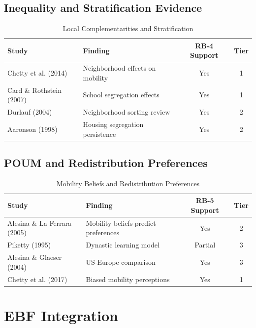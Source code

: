 \subsection{Inequality and Stratification Evidence}

\begin{table}[htbp]
\centering
\caption{Local Complementarities and Stratification}
\label{tab:rb-stratification}
\begin{tabular}{llcc}
\toprule
\textbf{Study} & \textbf{Finding} & \textbf{RB-4 Support} & \textbf{Tier} \\
\midrule
Chetty et al. (2014) & Neighborhood effects on mobility & Yes & 1 \\
Card \& Rothstein (2007) & School segregation effects & Yes & 1 \\
Durlauf (2004) & Neighborhood sorting review & Yes & 2 \\
Aaronson (1998) & Housing segregation persistence & Yes & 2 \\
\bottomrule
\end{tabular}
\end{table}

\subsection{POUM and Redistribution Preferences}

\begin{table}[htbp]
\centering
\caption{Mobility Beliefs and Redistribution Preferences}
\label{tab:rb-poum}
\begin{tabular}{llcc}
\toprule
\textbf{Study} & \textbf{Finding} & \textbf{RB-5 Support} & \textbf{Tier} \\
\midrule
Alesina \& La Ferrara (2005) & Mobility beliefs predict preferences & Yes & 2 \\
Piketty (1995) & Dynastic learning model & Partial & 3 \\
Alesina \& Glaeser (2004) & US-Europe comparison & Yes & 3 \\
Chetty et al. (2017) & Biased mobility perceptions & Yes & 1 \\
\bottomrule
\end{tabular}
\end{table}

\section{EBF Integration}
\label{sec:rb-integration}

